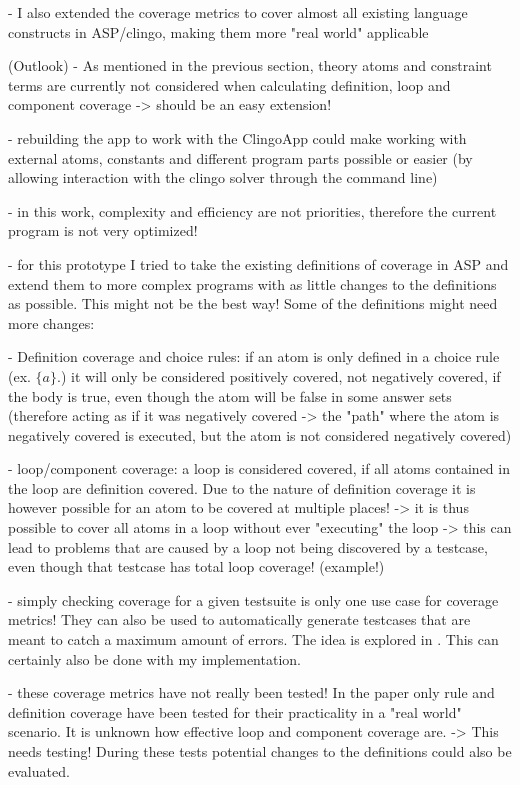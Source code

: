 - I also extended the coverage metrics to cover almost all existing language constructs in ASP/clingo, making them more "real world" 
applicable


(Outlook)
- As mentioned in the previous section, theory atoms and constraint terms are currently not considered when calculating definition, loop 
and component coverage -> should be an easy extension!

- rebuilding the app to work with the ClingoApp could make working with external atoms, constants and different program parts possible 
or easier (by allowing interaction with the clingo solver through the command line)

- in this work, complexity and efficiency are not priorities, therefore the current program is not very optimized!

- for this prototype I tried to take the existing definitions of coverage in ASP and extend them to more complex programs with as little 
changes to the definitions as possible. This might not be the best way! Some of the definitions might need more changes:

    - Definition coverage and choice rules: if an atom is only defined in a choice rule (ex. $\{a\}.$) it will only be considered positively 
    covered, not negatively covered, if the body is true, even though the atom will be false in some answer sets (therefore acting as if 
    it was negatively covered -> the "path" where the atom is negatively covered is executed, but the atom is not considered negatively covered)

    - loop/component coverage: a loop is considered covered, if all atoms contained in the loop are definition covered. Due to the nature 
    of definition coverage it is however possible for an atom to be covered at multiple places! -> it is thus possible to cover all 
    atoms in a loop without ever "executing" the loop -> this can lead to problems that are caused by a loop not being discovered by 
    a testcase, even though that testcase has total loop coverage! (example!)

- simply checking coverage for a given testsuite is only one use case for coverage metrics! They can also be used to automatically generate 
testcases that are meant to catch a maximum amount of errors. The idea is explored in \cite{Jan+11}. This can certainly also be done with 
my implementation.

- these coverage metrics have not really been tested! In the paper \cite{Jan+11} only rule and definition coverage have been tested for 
their practicality in a "real world" scenario. It is unknown how effective loop and component coverage are. -> This needs testing! 
During these tests potential changes to the definitions could also be evaluated.

